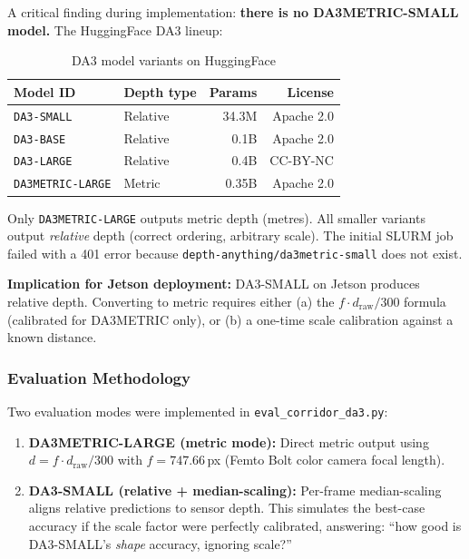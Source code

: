 \documentclass[11pt,a4paper]{article}
\begin{document}
A critical finding during implementation: \textbf{there is no
DA3METRIC-SMALL model.} The HuggingFace DA3 lineup:

\begin{table}[h]
\centering
\caption{DA3 model variants on HuggingFace}
\label{tab:da3-models}
\begin{tabular}{llrr}
\toprule
\textbf{Model ID} & \textbf{Depth type} & \textbf{Params} & \textbf{License} \\
\midrule
\texttt{DA3-SMALL}       & Relative    & 34.3M  & Apache 2.0 \\
\texttt{DA3-BASE}        & Relative    & 0.1B   & Apache 2.0 \\
\texttt{DA3-LARGE}       & Relative    & 0.4B   & CC-BY-NC \\
\texttt{DA3METRIC-LARGE} & Metric      & 0.35B  & Apache 2.0 \\
\bottomrule
\end{tabular}
\end{table}

Only \texttt{DA3METRIC-LARGE} outputs metric depth (metres). All smaller
variants output \emph{relative} depth (correct ordering, arbitrary scale).
The initial SLURM job failed with a 401 error because
\texttt{depth-anything/da3metric-small} does not exist.

\textbf{Implication for Jetson deployment:} DA3-SMALL on Jetson
produces relative depth. Converting to metric requires either (a) the
$f \cdot d_{\text{raw}} / 300$ formula (calibrated for DA3METRIC only),
or (b) a one-time scale calibration against a known distance.

\subsubsection{Evaluation Methodology}

Two evaluation modes were implemented in \texttt{eval\_corridor\_da3.py}:

\begin{enumerate}[nosep]
  \item \textbf{DA3METRIC-LARGE (metric mode):} Direct metric output
    using $d = f \cdot d_{\text{raw}} / 300$ with $f = 747.66$\,px
    (Femto Bolt color camera focal length).
  \item \textbf{DA3-SMALL (relative + median-scaling):} Per-frame
    median-scaling aligns relative predictions to sensor depth. This
    simulates the best-case accuracy if the scale factor were perfectly
    calibrated, answering: ``how good is DA3-SMALL's \emph{shape}
    accuracy, ignoring scale?''
\end{enumerate}
\end{document}
